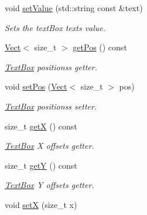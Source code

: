 \begin{DoxyCompactItemize}
void \hyperlink{class_arcade_1_1_text_box_a195c78d58c25c9f8a810a0ae7450220f}{set\+Value} (std\+::string const \&text)
\begin{DoxyCompactList}\small\item\em Sets the text\+Box text\textquotesingle{}s value. \end{DoxyCompactList}\item 
\hyperlink{class_arcade_1_1_vect}{Vect}$<$ size\+\_\+t $>$ \hyperlink{class_arcade_1_1_text_box_aaaf37e50180337a66b0895bffce126b7}{get\+Pos} () const
\begin{DoxyCompactList}\small\item\em \hyperlink{class_arcade_1_1_text_box}{Text\+Box} positions\textquotesingle{}s getter. \end{DoxyCompactList}\item 
void \hyperlink{class_arcade_1_1_text_box_aec7043b5dc883feed62a8e8eb9dea78d}{set\+Pos} (\hyperlink{class_arcade_1_1_vect}{Vect}$<$ size\+\_\+t $>$ pos)
\begin{DoxyCompactList}\small\item\em \hyperlink{class_arcade_1_1_text_box}{Text\+Box} positions\textquotesingle{}s setter. \end{DoxyCompactList}\item 
\mbox{\label{class_arcade_1_1_text_box_a0aba97e86b30ab14a0ba65a0ffc80b42}} 
size\+\_\+t \hyperlink{class_arcade_1_1_text_box_a0aba97e86b30ab14a0ba65a0ffc80b42}{getX} () const
\begin{DoxyCompactList}\small\item\em \hyperlink{class_arcade_1_1_text_box}{Text\+Box} X offset\textquotesingle{}s getter. \end{DoxyCompactList}\item 
\mbox{\label{class_arcade_1_1_text_box_a39794a2a5799911e0f7ebb53082e05bc}} 
size\+\_\+t \hyperlink{class_arcade_1_1_text_box_a39794a2a5799911e0f7ebb53082e05bc}{getY} () const
\begin{DoxyCompactList}\small\item\em \hyperlink{class_arcade_1_1_text_box}{Text\+Box} Y offset\textquotesingle{}s getter. \end{DoxyCompactList}\item 
\mbox{\label{class_arcade_1_1_text_box_aee7fe4770c6ccb3776f8bc4cb56b6208}} 
void \hyperlink{class_arcade_1_1_text_box_aee7fe4770c6ccb3776f8bc4cb56b6208}{setX} (size\+\_\+t x)

\end{DoxyCompactItemize}
